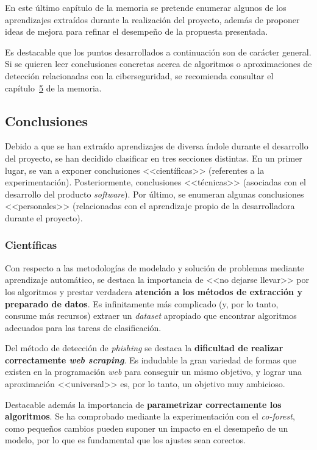 
En este último capítulo de la memoria se pretende enumerar algunos de los aprendizajes extraídos durante la realización del proyecto, además de proponer ideas de mejora para refinar el desempeño de la propuesta presentada.

Es destacable que los puntos desarrollados a continuación son de carácter general. Si se quieren leer conclusiones concretas acerca de algoritmos o aproximaciones de detección relacionadas con la ciberseguridad, se recomienda consultar el capítulo~\hyperref[s:5]{5} de la memoria.

\subsection{Conclusiones}

Debido a que se han extraído aprendizajes de diversa índole durante el desarrollo del proyecto, se han decidido clasificar en tres secciones distintas. En un primer lugar, se van a exponer conclusiones <<científicas>> (referentes a la experimentación). Posteriormente, conclusiones <<técnicas>> (asociadas con el desarrollo del producto \textit{software}). Por último, se enumeran algunas conclusiones <<personales>> (relacionadas con el aprendizaje propio de la desarrolladora durante el proyecto).

\subsubsection{Científicas}

Con respecto a las metodologías de modelado y solución de problemas mediante aprendizaje automático, se destaca la importancia de <<no dejarse llevar>> por los algoritmos y prestar verdadera \textbf{atención a los métodos de extracción y preparado de datos}. Es infinitamente más complicado (y, por lo tanto, consume más recursos) extraer un \textit{dataset} apropiado que encontrar algoritmos adecuados para las tareas de clasificación.

Del método de detección de \textit{phishing} se destaca la \textbf{dificultad de realizar correctamente \textit{web scraping}}. Es indudable la gran variedad de formas que existen en la programación \textit{web} para conseguir un mismo objetivo, y lograr una aproximación <<universal>> es, por lo tanto, un objetivo muy ambicioso.

Destacable además la importancia de \textbf{parametrizar correctamente los algoritmos}. Se ha comprobado mediante la experimentación con el \textit{co-forest}, como pequeños cambios pueden suponer un impacto en el desempeño de un modelo, por lo que es fundamental que los ajustes sean corectos.

